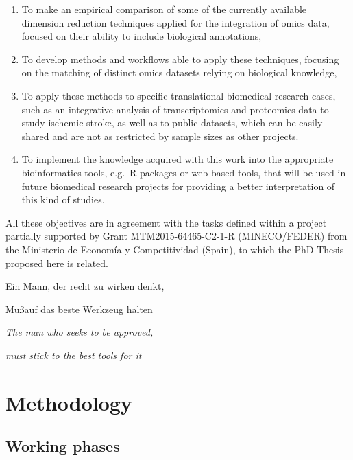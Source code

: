 \documentclass[a4paper, nobind]{templates/ociamthesis}
\renewcommand{\chaptermark}[1]{\markboth{\thechapter. #1}{\thechapter. #1}}
\begin{document}
\begin{enumerate}
\def\labelenumi{\arabic{enumi}.}
\item
  To make an empirical comparison of some of the currently available dimension reduction techniques applied for the integration of omics data, focused on their ability to include biological annotations,
\item
  To develop methods and workflows able to apply these techniques, focusing on the matching of distinct omics datasets relying on biological knowledge,
\item
  To apply these methods to specific translational biomedical research cases, such as an integrative analysis of transcriptomics and proteomics data to study ischemic stroke, as well as to public datasets, which can be easily shared and are not as restricted by sample sizes as other projects.
\item
  To implement the knowledge acquired with this work into the appropriate bioinformatics tools, e.g.~R packages or web-based tools, that will be used in future biomedical research projects for providing a better interpretation of this kind of studies.
\end{enumerate}

\begin{small}All these objectives are in agreement with the tasks defined within a project partially supported by Grant MTM2015-64465-C2-1-R (MINECO/FEDER) from the Ministerio de Economía y Competitividad (Spain), to which the PhD Thesis proposed here is related.\end{small}

\begin{savequote}
Ein Mann, der recht zu wirken denkt,

Mu\ss\enspace auf das beste Werkzeug halten

\emph{The man who seeks to be approved,}

\emph{must stick to the best tools for it}
\end{savequote}



\hypertarget{methods}{%
\chapter{Methodology}\label{methods}}

\chaptermark{Methodology}

\minitoc 

\hypertarget{work-phases}{%
\section{Working phases}\label{work-phases}}
\end{document}
